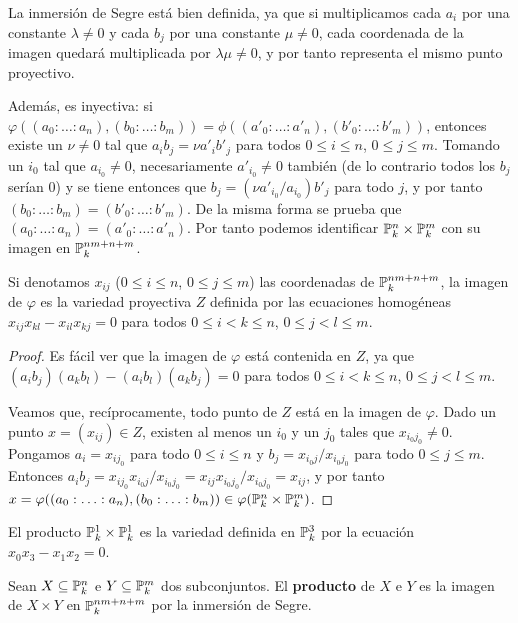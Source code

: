 \documentclass[ACGA.tex]{subfiles}
\begin{document}
La inmersión de Segre está bien definida, ya que si multiplicamos cada $a_i$ por una constante $\lambda\neq 0$ y cada $b_j$ por una constante $\mu\neq 0$, cada coordenada de la imagen quedará multiplicada por $\lambda\mu\neq 0$, y por tanto representa el mismo punto proyectivo.

Además, es inyectiva: si $\varphi((a_0:\ldots:a_n),(b_0:\ldots:b_m))=\phi((a'_0:\ldots:a'_n),(b'_0:\ldots:b'_m))$, entonces existe un $\nu\neq 0$ tal que $a_ib_j=\nu a'_ib'_j$ para todos $0\leq i\leq n$, $0\leq j\leq m$. Tomando un $i_0$ tal que $a_{i_0}\neq 0$, necesariamente $a'_{i_0}\neq 0$ también (de lo contrario todos los $b_j$ serían $0$) y se tiene entonces que $b_j=(\nu a'_{i_0}/a_{i_0})b'_j$ para todo $j$, y por tanto $(b_0:\ldots:b_m)=(b'_0:\ldots:b'_m)$. De la misma forma se prueba que $(a_0:\ldots:a_n)=(a'_0:\ldots:a'_n)$. Por tanto podemos identificar $\mathbb{P}^n_k\times\mathbb{P}^m_k$ con su imagen en $\mathbb{P}^{nm+n+m}_k$.

\begin{prop}
 Si denotamos $x_{ij}$ ($0\leq i\leq n$, $0\leq j\leq m$) las coordenadas de $\mathbb{P}^{nm+n+m}_k$, la imagen de $\varphi$ es la variedad proyectiva $Z$ definida por las ecuaciones homogéneas $x_{ij}x_{kl}-x_{il}x_{kj}=0$ para todos $0\leq i<k\leq n$, $0\leq j<l\leq m$. 
\end{prop}

\begin{proof}
 Es fácil ver que la imagen de $\varphi$ está contenida en $Z$, ya que $(a_ib_j)(a_kb_l)-(a_ib_l)(a_kb_j)=0$ para todos $0\leq i<k\leq n$, $0\leq j<l\leq m$. 

Veamos que, recíprocamente, todo punto de $Z$ está en la imagen de $\varphi$. Dado un punto $x=(x_{ij})\in Z$, existen al menos un $i_0$ y un $j_0$ tales que $x_{i_0j_0}\neq 0$. Pongamos $a_i=x_{ij_0}$ para todo $0\leq i\leq n$ y $b_j=x_{i_0j}/x_{i_0j_0}$ para todo $0\leq j\leq m$. Entonces $a_ib_j=x_{ij_0}x_{i_0j}/x_{i_0j_0}=x_{ij}x_{i_0j_0}/x_{i_0j_0}=x_{ij}$, y por tanto $x=\varphi((a_0:\ldots:a_n),(b_0:\ldots:b_m))\in\varphi(\mathbb{P}^n_k\times\mathbb{P}^m_k)$.
\end{proof}

\begin{ejs}
 El producto $\mathbb{P}^1_k\times\mathbb{P}^1_k$ es la variedad definida en $\mathbb{P}^3_k$ por la ecuación $x_0x_3-x_1x_2=0$.
\end{ejs}

\begin{defi} Sean $X\subseteq\mathbb{P}^n_k$ e $Y\subseteq\mathbb{P}^m_k$ dos subconjuntos. El {\bf producto} de $X$ e $Y$ es la imagen de $X\times Y$ en $\mathbb{P}^{nm+n+m}_k$ por la inmersión de Segre.
 \end{defi}
\end{document}
